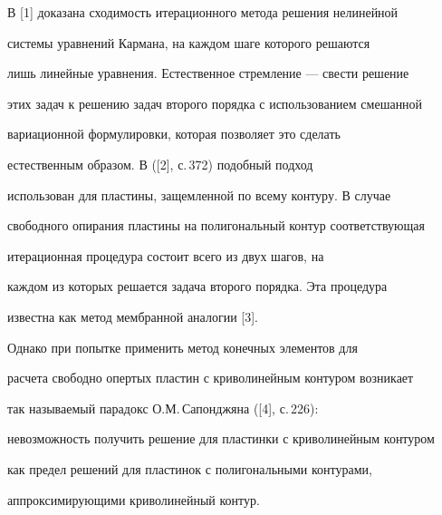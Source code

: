 \date{} 




\pagestyle{plain} %


 




\maketitle 


\label{begin} 


 


 


В [1] доказана сходимость итерационного метода решения нелинейной 


системы уравнений Кармана, на каждом шаге которого решаются 


лишь линейные уравнения. Естественное стремление --- свести решение 


этих задач к решению задач второго порядка с использованием смешанной 


вариационной формулировки, которая позволяет это сделать 


естественным образом. В ([2], с.\,372) подобный подход 


использован для пластины, защемленной по всему контуру. В случае 


свободного опирания пластины на полигональный контур соответствующая 


итерационная процедура состоит всего из двух шагов, на 


каждом из которых решается задача второго порядка. Эта процедура 


известна как метод мембранной аналогии [3]. 


 


Однако при попытке применить метод конечных элементов для 


расчета свободно опертых пластин с криволинейным контуром возникает 


так называемый парадокс О.М.\,Сапонджяна ([4], с.\,226): 


невозможность получить решение для пластинки с криволинейным контуром 


как предел решений для пластинок с полигональными контурами, 


аппроксимирующими криволинейный контур. 


